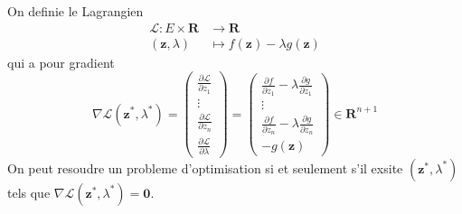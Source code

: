 \begin{definition}
On definie le Lagrangien
\begin{align*}
\mathcal{L}:E\times \mathbf{R} & \to \mathbf{R} \\
(\boldsymbol{z},\lambda) & \mapsto f(\boldsymbol{z})-\lambda g(\boldsymbol{z})
\end{align*}
qui a pour gradient
$$
\nabla \mathcal{L}(\boldsymbol{z}^{*},\lambda^{*})=\begin{pmatrix}
\frac{ \partial \mathcal{L}}{ \partial z_{1} }  \\
\vdots \\
\frac{ \partial \mathcal{L} }{ \partial z_{n} }  \\
\frac{ \partial \mathcal{L} }{ \partial \lambda } 
\end{pmatrix}=\begin{pmatrix}
\frac{ \partial f }{ \partial z_{1} } -\lambda \frac{ \partial g }{ \partial z_{1} } \\
\vdots \\
\frac{ \partial f }{ \partial z_{n} } -\lambda \frac{ \partial g }{ \partial z_{n} } \\
-g(\boldsymbol{z})  
\end{pmatrix}\in \mathbf{R}^{n+1}
$$
On peut resoudre un probleme d'optimisation si et seulement s'il exsite $(\boldsymbol{z}^{*},\lambda ^{*})$ tels que $\nabla \mathcal{L}(\boldsymbol{z}^{*},\lambda ^{*})=\boldsymbol{0}$.
\end{definition}
